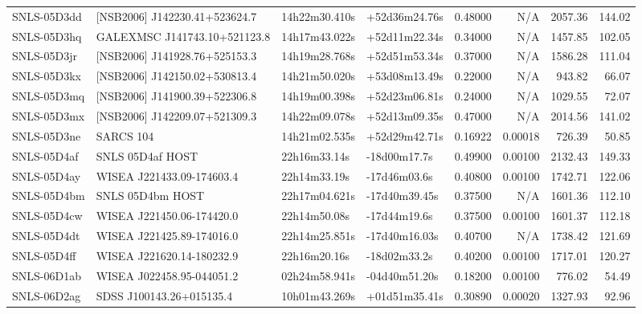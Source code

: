 \begin{longtable}{llllrrrr}
SNLS-05D3dd      &  [NSB2006] J142230.41+523624.7  &   14h22m30.410s &   +52d36m24.76s &  0.48000 &      N/A &  2057.36 &      144.02 \\
SNLS-05D3hq      &  GALEXMSC J141743.10+521123.8   &   14h17m43.022s &   +52d11m22.34s &  0.34000 &      N/A &  1457.85 &      102.05 \\
SNLS-05D3jr      &  [NSB2006] J141928.76+525153.3  &   14h19m28.768s &   +52d51m53.34s &  0.37000 &      N/A &  1586.28 &      111.04 \\
SNLS-05D3kx      &  [NSB2006] J142150.02+530813.4  &   14h21m50.020s &   +53d08m13.49s &  0.22000 &      N/A &   943.82 &       66.07 \\
SNLS-05D3mq      &  [NSB2006] J141900.39+522306.8  &   14h19m00.398s &   +52d23m06.81s &  0.24000 &      N/A &  1029.55 &       72.07 \\
SNLS-05D3mx      &  [NSB2006] J142209.07+521309.3  &   14h22m09.078s &   +52d13m09.35s &  0.47000 &      N/A &  2014.56 &      141.02 \\
SNLS-05D3ne      &                       SARCS 104 &   14h21m02.535s &   +52d29m42.71s &  0.16922 &  0.00018 &   726.39 &       50.85 \\
SNLS-05D4af      &                SNLS 05D4af HOST &    22h16m33.14s &    -18d00m17.7s &  0.49900 &  0.00100 &  2132.43 &      149.33 \\
SNLS-05D4ay      &       WISEA J221433.09-174603.4 &    22h14m33.19s &    -17d46m03.6s &  0.40800 &  0.00100 &  1742.71 &      122.06 \\
SNLS-05D4bm      &                SNLS 05D4bm HOST &   22h17m04.621s &   -17d40m39.45s &  0.37500 &      N/A &  1601.36 &      112.10 \\
SNLS-05D4cw      &       WISEA J221450.06-174420.0 &    22h14m50.08s &    -17d44m19.6s &  0.37500 &  0.00100 &  1601.37 &      112.18 \\
SNLS-05D4dt      &       WISEA J221425.89-174016.0 &   22h14m25.851s &   -17d40m16.03s &  0.40700 &      N/A &  1738.42 &      121.69 \\
SNLS-05D4ff      &       WISEA J221620.14-180232.9 &    22h16m20.16s &    -18d02m33.2s &  0.40200 &  0.00100 &  1717.01 &      120.27 \\
SNLS-06D1ab      &       WISEA J022458.95-044051.2 &   02h24m58.941s &   -04d40m51.20s &  0.18200 &  0.00100 &   776.02 &       54.49 \\
SNLS-06D2ag      &        SDSS J100143.26+015135.4 &   10h01m43.269s &   +01d51m35.41s &  0.30890 &  0.00020 &  1327.93 &       92.96 \\

\end{longtable}
